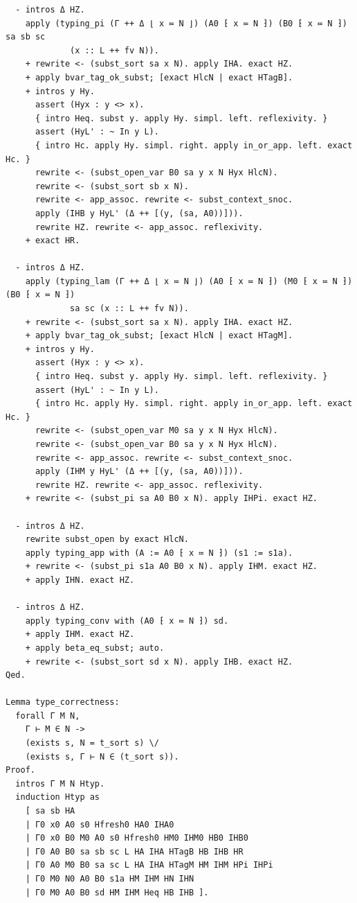 \begin{latin}
\begin{verbatim}
  - intros Δ HZ.
    apply (typing_pi (Γ ++ Δ ⌊ x ≔ N ⌋) (A0 ⁅ x ≔ N ⁆) (B0 ⁅ x ≔ N ⁆) sa sb sc
             (x :: L ++ fv N)).
    + rewrite <- (subst_sort sa x N). apply IHA. exact HZ.
    + apply bvar_tag_ok_subst; [exact HlcN | exact HTagB].
    + intros y Hy.
      assert (Hyx : y <> x).
      { intro Heq. subst y. apply Hy. simpl. left. reflexivity. }
      assert (HyL' : ~ In y L).
      { intro Hc. apply Hy. simpl. right. apply in_or_app. left. exact Hc. }
      rewrite <- (subst_open_var B0 sa y x N Hyx HlcN).
      rewrite <- (subst_sort sb x N).
      rewrite <- app_assoc. rewrite <- subst_context_snoc.
      apply (IHB y HyL' (Δ ++ [(y, (sa, A0))])).
      rewrite HZ. rewrite <- app_assoc. reflexivity.
    + exact HR.

  - intros Δ HZ.
    apply (typing_lam (Γ ++ Δ ⌊ x ≔ N ⌋) (A0 ⁅ x ≔ N ⁆) (M0 ⁅ x ≔ N ⁆) (B0 ⁅ x ≔ N ⁆)
             sa sc (x :: L ++ fv N)).
    + rewrite <- (subst_sort sa x N). apply IHA. exact HZ.
    + apply bvar_tag_ok_subst; [exact HlcN | exact HTagM].
    + intros y Hy.
      assert (Hyx : y <> x).
      { intro Heq. subst y. apply Hy. simpl. left. reflexivity. }
      assert (HyL' : ~ In y L).
      { intro Hc. apply Hy. simpl. right. apply in_or_app. left. exact Hc. }
      rewrite <- (subst_open_var M0 sa y x N Hyx HlcN).
      rewrite <- (subst_open_var B0 sa y x N Hyx HlcN).
      rewrite <- app_assoc. rewrite <- subst_context_snoc.
      apply (IHM y HyL' (Δ ++ [(y, (sa, A0))])).
      rewrite HZ. rewrite <- app_assoc. reflexivity.
    + rewrite <- (subst_pi sa A0 B0 x N). apply IHPi. exact HZ.

  - intros Δ HZ.
    rewrite subst_open by exact HlcN.
    apply typing_app with (A := A0 ⁅ x ≔ N ⁆) (s1 := s1a).
    + rewrite <- (subst_pi s1a A0 B0 x N). apply IHM. exact HZ.
    + apply IHN. exact HZ.

  - intros Δ HZ.
    apply typing_conv with (A0 ⁅ x ≔ N ⁆) sd.
    + apply IHM. exact HZ.
    + apply beta_eq_subst; auto.
    + rewrite <- (subst_sort sd x N). apply IHB. exact HZ.
Qed.

Lemma type_correctness:
  forall Γ M N,
    Γ ⊢ M ∈ N ->
    (exists s, N = t_sort s) \/
    (exists s, Γ ⊢ N ∈ (t_sort s)).
Proof.
  intros Γ M N Htyp.
  induction Htyp as
    [ sa sb HA
    | Γ0 x0 A0 s0 Hfresh0 HA0 IHA0
    | Γ0 x0 B0 M0 A0 s0 Hfresh0 HM0 IHM0 HB0 IHB0
    | Γ0 A0 B0 sa sb sc L HA IHA HTagB HB IHB HR
    | Γ0 A0 M0 B0 sa sc L HA IHA HTagM HM IHM HPi IHPi
    | Γ0 M0 N0 A0 B0 s1a HM IHM HN IHN
    | Γ0 M0 A0 B0 sd HM IHM Heq HB IHB ].


\end{verbatim}
\end{latin}

